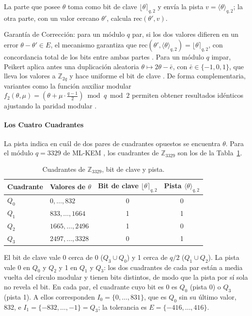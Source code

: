 La parte que posee $\theta$ toma como bit de clave $\lfloor \theta \rceil_{q, 2}$ y envía la pista $v = \langle \theta \rangle_{q, 2}$; la otra parte, con un valor cercano $\theta'$, calcula $\mathrm{rec}(\theta', v)$.

Garantía de Corrección: para un módulo $q$ par, si los dos valores difieren en un error $\theta - \theta' \in E$, el mecanismo garantiza que $\mathrm{rec}(\theta', \langle \theta \rangle_{q, 2}) = \lfloor \theta \rceil_{q, 2}$, con concordancia total de los bits entre ambas partes \cite{yang2025multiserver}. Para un módulo $q$ impar, Peikert aplica antes una duplicación aleatoria $\theta \mapsto 2\theta - \bar{e}$, con $\bar{e} \in \{-1, 0, 1\}$, que lleva los valores a $\mathbb{Z}_{2q}$ y hace uniforme el bit de clave \cite{peikert2014lattice, yang2025multiserver}. De forma complementaria, variantes como la función auxiliar modular $f_2(\theta, \mu) = \left(\theta + \mu \cdot \frac{q-1}{2}\right) \bmod q \bmod 2$ permiten obtener resultados idénticos ajustando la paridad modular \cite{rewal2023quantumsafe}.

\paragraph{Los Cuatro Cuadrantes}

La pista indica en cuál de dos pares de cuadrantes opuestos se encuentra $\theta$. Para el módulo $q = 3329$ de ML-KEM \cite{nist2024fips203}, los cuadrantes de $\mathbb{Z}_{3329}$ son los de la Tabla~\ref{tab:cuadrantes}.

\begin{table}[H]
\centering
\caption{Cuadrantes de $\mathbb{Z}_{3329}$, bit de clave y pista.}
\label{tab:cuadrantes}
\small
\begin{tabular}{llcc}
\toprule
\textbf{Cuadrante} & \textbf{Valores de $\theta$} & \textbf{Bit de clave $\lfloor \theta \rceil_{q,2}$} & \textbf{Pista $\langle \theta \rangle_{q,2}$} \\
\midrule
$Q_0$ & $0, \dots, 832$ & 0 & 0 \\
$Q_1$ & $833, \dots, 1664$ & 1 & 1 \\
$Q_2$ & $1665, \dots, 2496$ & 1 & 0 \\
$Q_3$ & $2497, \dots, 3328$ & 0 & 1 \\
\bottomrule
\end{tabular}
\end{table}

El bit de clave vale 0 cerca de $0$ ($Q_3 \cup Q_0$) y 1 cerca de $q/2$ ($Q_1 \cup Q_2$). La pista vale 0 en $Q_0$ y $Q_2$ y 1 en $Q_1$ y $Q_3$: los dos cuadrantes de cada par están a media vuelta del círculo modular y tienen bits distintos, de modo que la pista por sí sola no revela el bit. En cada par, el cuadrante cuyo bit es 0 es $Q_0$ (pista 0) o $Q_3$ (pista 1). A ellos corresponden $I_0 = \{0, \dots, 831\}$, que es $Q_0$ sin su último valor, 832, e $I_1 = \{-832, \dots, -1\} = Q_3$; la tolerancia es $E = \{-416, \dots, 416\}$.


